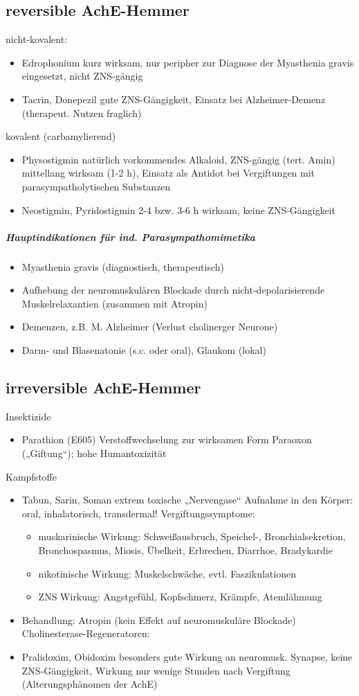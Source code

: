 \documentclass[10pt,a4paper]{report}
\begin{document}
\subsection{reversible AchE-Hemmer}
nicht-kovalent:
\begin{itemize}
	\item Edrophonium kurz wirksam, nur peripher zur Diagnose der Myasthenia gravis eingesetzt, nicht ZNS-gängig
	\item Tacrin, Donepezil gute ZNS-Gängigkeit, Einsatz bei Alzheimer-Demenz (therapeut. Nutzen fraglich)
\end{itemize}
kovalent (carbamylierend)
\begin{itemize}
	\item Physostigmin natürlich vorkommendes Alkaloid, ZNS-gängig (tert. Amin) mittellang wirksam (1-2 h), Einsatz als Antidot bei Vergiftungen mit parasympatholytischen Substanzen 
	\item Neostigmin, Pyridostigmin 2-4 bzw. 3-6 h wirksam, keine ZNS-Gängigkeit
\end{itemize}
\subparagraph{Hauptindikationen für ind. Parasympathomimetika}
\begin{itemize}
	\item Myasthenia gravis (diagnostisch, therapeutisch)
	\item Aufhebung der neuromuskulären Blockade durch nicht-depolarisierende 	Muskelrelaxantien (zusammen mit Atropin)
	\item Demenzen, z.B. M. Alzheimer (Verlust cholinerger Neurone)
	\item Darm- und Blasenatonie (s.c. oder oral), Glaukom (lokal)
\end{itemize}
\subsection{irreversible AchE-Hemmer}
Insektizide
\begin{itemize}
	\item Parathion (E605)	Verstoffwechselung zur wirksamen Form Paraoxon („Giftung“); hohe Humantoxizität
\end{itemize}
Kampfstoffe
\begin{itemize}
	\item Tabun, Sarin, Soman	extrem toxische „Nervengase“	
Aufnahme in den Körper:  oral, inhalatorisch, transdermal!
Vergiftungssymptome: 
	\begin{itemize}
		\item muskarinische Wirkung: Schweißausbruch, Speichel-, 	Bronchialsekretion, Bronchospasmus, Miosis, Übelkeit, Erbrechen, Diarrhoe, Bradykardie
		\item nikotinische Wirkung:	Muskelschwäche, evtl. Faszikulationen
		\item ZNS Wirkung: Angstgefühl, Kopfschmerz, Krämpfe, Atemlähmung
\end{itemize}
	\item Behandlung:	Atropin (kein Effekt auf neuromuskuläre Blockade)
		Cholinesterase-Regeneratoren:
	\item Pralidoxim, Obidoxim	besonders gute Wirkung an neuromusk. Synapse, keine ZNS-Gängigkeit, Wirkung nur wenige Stunden nach Vergiftung (Alterungsphänomen der AchE)
\end{itemize}
\end{document}
